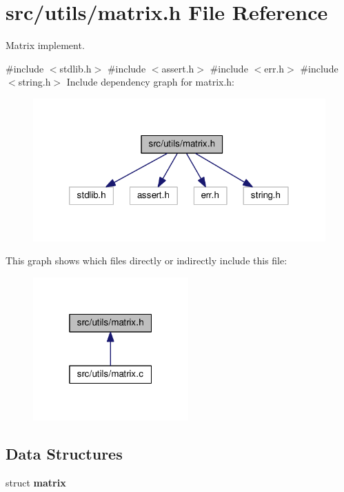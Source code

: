 \section{src/utils/matrix.h File Reference}
\label{matrix_8h}


Matrix implement.  


{\ttfamily \#include $<$stdlib.\+h$>$}\newline
{\ttfamily \#include $<$assert.\+h$>$}\newline
{\ttfamily \#include $<$err.\+h$>$}\newline
{\ttfamily \#include $<$string.\+h$>$}\newline
Include dependency graph for matrix.\+h\+:
\nopagebreak
\begin{figure}[H]
\begin{center}
\leavevmode
\includegraphics[width=320pt]{matrix_8h__incl}
\end{center}
\end{figure}
This graph shows which files directly or indirectly include this file\+:
\nopagebreak
\begin{figure}[H]
\begin{center}
\leavevmode
\includegraphics[width=169pt]{matrix_8h__dep__incl}
\end{center}
\end{figure}
\subsection*{Data Structures}
\begin{DoxyCompactItemize}
\item 
struct \textbf{ matrix}
\end{DoxyCompactItemize}
